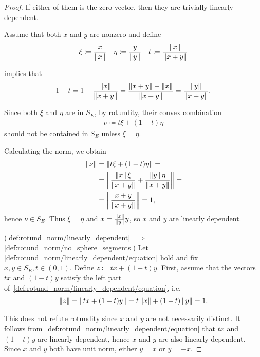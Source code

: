 \begin{proof}
  If either of them is the zero vector, then they are trivially linearly dependent.

  Assume that both $x$ and $y$ are nonzero and define
  \begin{align*}
    \xi \coloneqq \frac x {\left\Vert x \right\Vert}
    &&
    \eta \coloneqq \frac y {\left\Vert y \right\Vert}
    &&
    t \coloneqq \frac {\left\Vert x \right\Vert} {\left\Vert x + y \right\Vert}
  \end{align*}

   implies that
  \begin{align*}
    1 - t = 1 - \frac {\left\Vert x \right\Vert} {\left\Vert x + y \right\Vert} = \frac {\left\Vert x + y \right\Vert - \left\Vert x \right\Vert} {\left\Vert x + y \right\Vert} = \frac {\left\Vert y \right\Vert} {\left\Vert x+y \right\Vert}.
  \end{align*}

  Since both $\xi$ and $\eta$ are in $S_E$, by rotundity, their convex combination
  \begin{align*}
    \nu \coloneqq t \xi + (1-t)\eta
  \end{align*}
  should not be contained in $S_E$ unless $\xi = \eta$.

  Calculating the norm, we obtain
  \begin{align*}
    \left\Vert \nu \right\Vert
    &=
    \left\Vert t \xi + (1-t)\eta \right\Vert
    = \\ &=
    \left\Vert \frac {\left\Vert x \right\Vert \xi} {\left\Vert x + y \right\Vert} + \frac {\left\Vert y \right\Vert \eta} {\left\Vert x + y \right\Vert} \right\Vert
    = \\ &=
    \left\Vert \frac {x + y} {\left\Vert x + y \right\Vert} \right\Vert
    = 1,
  \end{align*}
  hence $\nu \in S_E$. Thus $\xi = \eta$ and $x = \frac {\left\Vert x \right\Vert} {\left\Vert y \right\Vert} y$, so $x$ and $y$ are linearly dependent.

  (\ref{def:rotund_norm/linearly_dependent} $\implies$ \ref{def:rotund_norm/no_sphere_segments}) Let \cref{def:rotund_norm/linearly_dependent/equation} hold and fix $x, y \in S_E, t \in (0, 1)$. Define $z \coloneqq tx + (1-t)y$.
  First, assume that the vectors $tx$ and $(1-t)y$ satisfy the left part of~\cref{def:rotund_norm/linearly_dependent/equation}, i.e.
  \begin{align*}
     \left\Vert z \right\Vert = \left\Vert tx + (1-t)y \right\Vert = t \left\Vert x \right\Vert + (1-t) \left\Vert y \right\Vert = 1.
  \end{align*}

  This does not refute rotundity since $x$ and $y$ are not necessarily distinct. It follows from~\cref{def:rotund_norm/linearly_dependent/equation} that $tx$ and $(1-t)y$ are linearly dependent, hence $x$ and $y$ are also linearly dependent. Since $x$ and $y$ both have unit norm, either $y = x$ or $y = -x$.


\end{proof}

